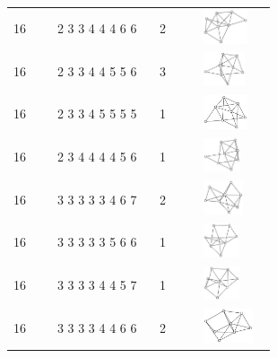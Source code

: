 \begin{table}[h!]
\begin{tabular}{m{0.15\linewidth} m{0.35\linewidth} m{0.15\linewidth} m{0.25\linewidth}}
16 & 2 3 3 4 4 4 6 6 & 2 & \includegraphics[height=1cm]{15-universal-graphs/img/degree-sequences-example-graphs/graph-4-8-143}\\
16 & 2 3 3 4 4 5 5 6 & 3 & \includegraphics[height=1cm]{15-universal-graphs/img/degree-sequences-example-graphs/graph-4-8-144}\\
16 & 2 3 3 4 5 5 5 5 & 1 & \includegraphics[height=1cm]{15-universal-graphs/img/degree-sequences-example-graphs/graph-4-8-145}\\
16 & 2 3 4 4 4 4 5 6 & 1 & \includegraphics[height=1cm]{15-universal-graphs/img/degree-sequences-example-graphs/graph-4-8-146}\\
16 & 3 3 3 3 3 4 6 7 & 2 & \includegraphics[height=1cm]{15-universal-graphs/img/degree-sequences-example-graphs/graph-4-8-147}\\
16 & 3 3 3 3 3 5 6 6 & 1 & \includegraphics[height=1cm]{15-universal-graphs/img/degree-sequences-example-graphs/graph-4-8-148}\\
16 & 3 3 3 3 4 4 5 7 & 1 & \includegraphics[height=1cm]{15-universal-graphs/img/degree-sequences-example-graphs/graph-4-8-149}\\
16 & 3 3 3 3 4 4 6 6 & 2 & \includegraphics[height=1cm]{15-universal-graphs/img/degree-sequences-example-graphs/graph-4-8-150}\\

\end{tabular}
\end{table}
